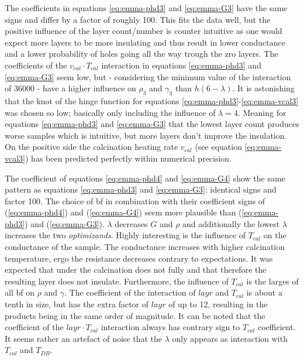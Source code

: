 The coefficients in equations \ref{eq:emma-phd3} and \ref{eq:emma-G3} have the same signs and differ by a factor of roughly 100.
This fits the data well, but the positive influence of the layer count/number is counter intuitive 
as one would expect more layers to be more insulating and thus result in lower conductance and a lower probability of holes going all the way trough the \gls{zro} layers. %
The coefficients of the $v_{cal} \cdot T_{cal}$ interaction in equations \ref{eq:emma-phd3} and \ref{eq:emma-G3} 
seem low, but - considering the minimum value of the interaction of \num{36000} - have a higher influence on $\rho_3$ and $\gamma_3$ than $h(6 - \lambda)$. 
It is astonishing that the knot of the hinge function for equations \ref{eq:emma-phd3}-\ref{eq:emma-vcal3} was chosen so low; 
basically only including the influence of $\lambda=4$.
Meaning for equations \ref{eq:emma-phd3} and \ref{eq:emma-G3} that the lowest layer count produces worse samples which is intuitive, but more layers don't improve the insulation. 
On the positive side the calcination heating rate $v_{cal}$ (see equation \ref{eq:emma-vcal3}) has been predicted perfectly within numerical precision. 

The coefficient of equations \ref{eq:emma-phd4} and \ref{eq:emma-G4} show the same pattern 
as equations \ref{eq:emma-phd3} and \ref{eq:emma-G3}: identical signs and factor 100. 
The choice of \gls{bf} in combination with their coefficient signs of 
(\ref{eq:emma-phd4}) and (\ref{eq:emma-G4}) seem more plausible than (\ref{eq:emma-phd3}) and (\ref{eq:emma-G3}). 
$\lambda$ decreases $G$ and $\rho$ and additionally the lowest $\lambda$ increases the two \textit{optimizands}. 
Highly interesting is the influence of $T_{cal}$ on the conductance of the sample. 
The conductance increases with higher calcination temperature, ergo the resistance decreases contrary to expectations.
It was expected that under  the calcination does not fully  and 
that therefore the resulting layer does not insulate. 
Furthermore, the influence of $T_{cal}$ is the larges of all \gls{bf} on $\rho$ and $\gamma$.
The coefficient of the interaction of $layr$ and $T_{cal}$ is about a tenth in size, 
but has the extra factor of $layr$ of up to 12, resulting in the products being in the same order of magnitude.
It can be noted that the coefficient of the $layr\cdot T_{cal}$ interaction always has contrary sign to $T_{cal}$ coefficient. 
It seems rather an artefact of noise that the $\lambda$ only appears as interaction 
with $T_{cal}$ and $T_{DB}$. 

